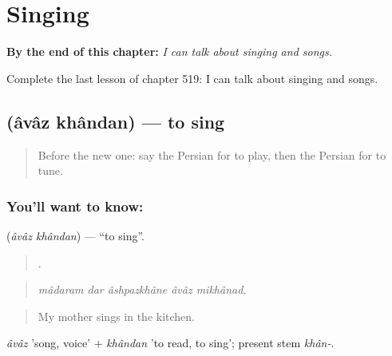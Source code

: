 
\chapter{Singing}
\label{ch:fa-singing}

\begin{chapteropening}
\textbf{By the end of this chapter:} \emph{I can talk about singing and songs.}

Complete the last lesson of chapter 519: I can talk about singing and songs.
\end{chapteropening}

\section[\texorpdfstring{\fa{آواز} \fa{خواندن} (âvâz khândan)}{آواز خواندن (âvâz khândan)}]{  (âvâz khândan) — to sing}

\label{lesson:FA-C519-avaz-khandan}



\begin{quote}
Before the new one: say the Persian for to play, then the Persian for to tune.
\end{quote}

\subsection*{You'll want to know:  }
\textbf{ } (\emph{âvâz khândan}) — \textquotedblleft{}to sing\textquotedblright{}.

\begin{quote}
    .
\end{quote}

\begin{quote}
\emph{mâdaram dar âshpazkhâne âvâz mikhânad.}
\end{quote}

\begin{quote}
My mother sings in the kitchen.
\end{quote}

\emph{âvâz} 'song, voice' + \emph{khândan} 'to read, to sing'; present stem \emph{khân-}.

